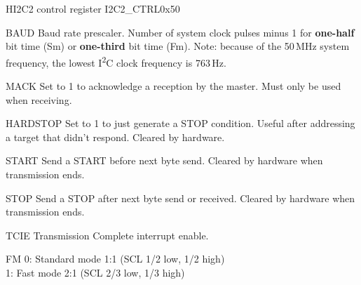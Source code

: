 \documentclass[12pt]{article}
\begin{document}
\begin{register}{H}{I2C2 control register I2C2\_CTRL}{0x50}
\label{i2c2ctrl}
%
%
%
%
%
%
%
%
%
\regnewline%
\end{register}
\begin{regdesc}[0.9\textwidth]\begin{reglist}[000000000]
\item [BAUD] Baud rate prescaler. Number of system clock pulses minus 1 for \textbf{one-half} bit time (Sm) or \textbf{one-third} bit time (Fm).
Note: because of the 50\,MHz system frequency, the lowest I\textsuperscript{2}C clock frequency is 763\,Hz.
\item [MACK] Set to 1 to acknowledge a reception by the master. Must only be used when receiving.
\item [HARDSTOP] Set to 1 to just generate a STOP condition. Useful after addressing a target that didn't respond. Cleared by hardware.
\item [START] Send a START before next byte send. Cleared by hardware when transmission ends.
\item [STOP] Send a STOP after next byte send or received. Cleared by hardware when transmission ends.
\item [TCIE] Transmission Complete interrupt enable.
\item [FM] 0: Standard mode 1:1 (SCL 1/2 low, 1/2 high)\\1: Fast mode 2:1 (SCL 2/3 low, 1/3 high)
\end{reglist}\end{regdesc}
\end{document}
